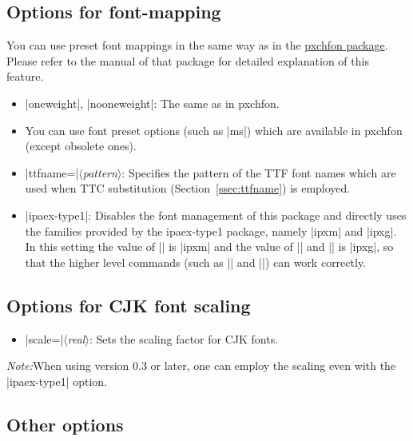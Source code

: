 \documentclass[a4paper]{article}
\newcommand{\Pkg}[1]{\textsf{#1}}
\newcommand{\Meta}[1]{$\langle$\textit{#1}$\rangle$}
\newcommand{\Note}{\par\noindent \emph{Note:}\quad}
\newcommand{\Means}{:\hspace{1em plus 1em}}
\begin{document}
\subsection{Options for font-mapping}

You can use preset font mappings in the same way as in the
\href{http://www.ctan.org/pkg/pxchfon}{\Pkg{pxchfon} package}.
Please refer to the manual of that package for detailed explanation
of this feature.

\begin{itemize}
\item |oneweight|, |nooneweight|\Means
  The same as in \Pkg{pxchfon}.
\item You can use font preset options (such as |ms|) which are available
  in \Pkg{pxchfon} (except obsolete ones).
\item |ttfname=|\Meta{pattern}\Means
  Specifies the pattern of the TTF font names which are used when TTC
  substitution (Section~\ref{ssec:ttfname}) is employed.

\item |ipaex-type1|\Means
  Disables the font management of this package and directly uses the
  families provided by the \Pkg{ipaex-type1} package,
  namely |ipxm| and |ipxg|.
  In this setting the value of |\mcdefault| is |ipxm| and the value of
  |\gtdefault| and |\mgdefault| is |ipxg|, so that the higher level
  commands (such as |\sffamily| and |\gtfamily|) can work correctly.
\end{itemize}

\subsection{Options for CJK font scaling}

\begin{itemize}
\item |scale=|\Meta{real}\Means
  Sets the scaling factor for CJK fonts.
\end{itemize}

\Note When using version 0.3 or later,
one can employ the scaling even with the
|ipaex-type1| option.

\subsection{Other options}
\end{document}
